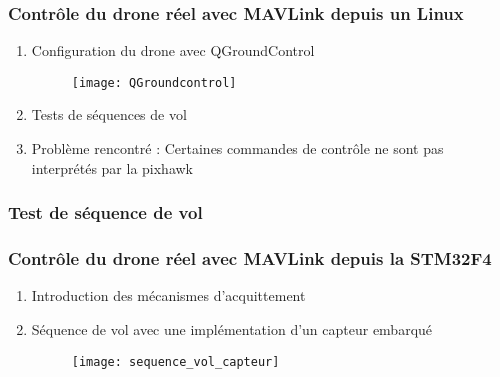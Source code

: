 \documentclass{beamer}
\begin{document}

\begin{frame}
\frametitle{Contr\^ole du drone r\'eel avec MAVLink depuis un Linux}

\begin{enumerate}

\item Configuration du drone avec QGroundControl

	\begin{figure}
	
		\texttt{[image: QGroundcontrol]}
	
	\end{figure}

\item Tests de s\'equences de vol
\item Probl\`eme rencontr\'e : Certaines commandes de contr\^ole ne sont pas interpr\'et\'es par la pixhawk


\end{enumerate}


\end{frame}



\begin{frame}

\frametitle{Test de s\'equence de vol}



\end{frame}


\begin{frame}
\frametitle{Contr\^ole du drone r\'eel avec MAVLink depuis la STM32F4}


\begin{enumerate}
\item Introduction des m\'ecanismes d'acquittement

\item S\'equence de vol avec une impl\'ementation d'un capteur embarqu\'e
	\begin{figure}
	
		\texttt{[image: sequence\_vol\_capteur]}
	
	\end{figure}

\end{enumerate}

\end{frame}
\end{document}
